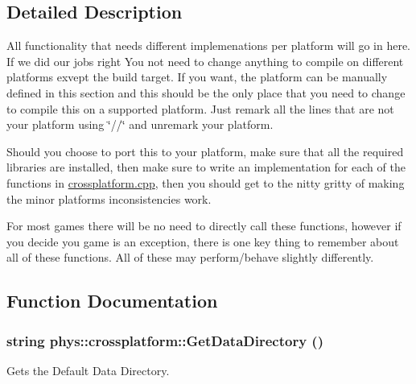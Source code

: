 \subsection{Detailed Description}
All functionality that needs different implemenations per platform will go in here. If we did our jobs right You not need to change anything to compile on different platforms exvept the build target. If you want, the platform can be manually defined in this section and this should be the only place that you need to change to compile this on a supported platform. Just remark all the lines that are not your platform using \char`\"{}//\char`\"{} and unremark your platform. \par
\par
 Should you choose to port this to your platform, make sure that all the required libraries are installed, then make sure to write an implementation for each of the functions in \hyperlink{crossplatform_8cpp_source}{crossplatform.cpp}, then you should get to the nitty gritty of making the minor platforms inconsistencies work. \par
\par
 For most games there will be no need to directly call these functions, however if you decide you game is an exception, there is one key thing to remember about all of these functions. All of these may perform/behave slightly differently. 

\subsection{Function Documentation}
\hypertarget{namespacephys_1_1crossplatform_ac73c7f2db76ddfeb41723d72decc1366}{
\subsubsection[{GetDataDirectory}]{\setlength{\rightskip}{0pt plus 5cm}string phys::crossplatform::GetDataDirectory ()}}
\label{d4/d59/namespacephys_1_1crossplatform_ac73c7f2db76ddfeb41723d72decc1366}


Gets the Default Data Directory. 

